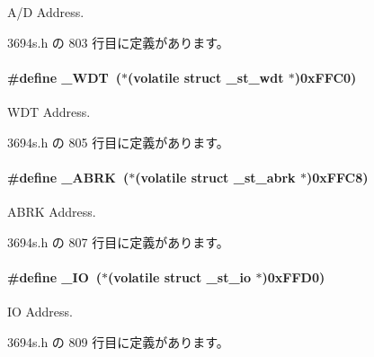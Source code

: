 A/\+D Address. 



 3694s.\+h の 803 行目に定義があります。

\paragraph[{\+\_\+\+W\+D\+T}]{\setlength{\rightskip}{0pt plus 5cm}\#define \+\_\+\+W\+D\+T~($\ast$(volatile struct {\bf \+\_\+st\+\_\+wdt}   $\ast$)0x\+F\+F\+C0)}\label{3694s_8h_a6db50fd1998eb4ff09c85f8493fedad0_a6db50fd1998eb4ff09c85f8493fedad0}


W\+D\+T Address. 



 3694s.\+h の 805 行目に定義があります。

\paragraph[{\+\_\+\+A\+B\+R\+K}]{\setlength{\rightskip}{0pt plus 5cm}\#define \+\_\+\+A\+B\+R\+K~($\ast$(volatile struct {\bf \+\_\+st\+\_\+abrk}  $\ast$)0x\+F\+F\+C8)}\label{3694s_8h_a6a781f449aab73ea1a155a003e25df71_a6a781f449aab73ea1a155a003e25df71}


A\+B\+R\+K Address. 



 3694s.\+h の 807 行目に定義があります。

\paragraph[{\+\_\+\+I\+O}]{\setlength{\rightskip}{0pt plus 5cm}\#define \+\_\+\+I\+O~($\ast$(volatile struct {\bf \+\_\+st\+\_\+io}    $\ast$)0x\+F\+F\+D0)}\label{3694s_8h_a481f1b6501d20c1a3d4b6f209953960f_a481f1b6501d20c1a3d4b6f209953960f}


I\+O Address. 



 3694s.\+h の 809 行目に定義があります。

